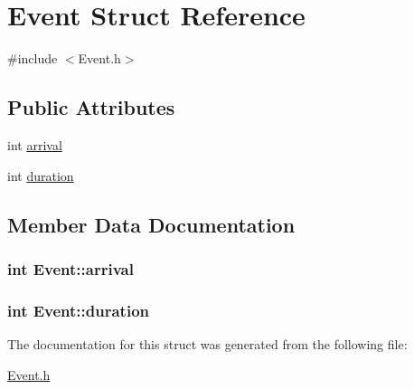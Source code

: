 \hypertarget{struct_event}{}\section{Event Struct Reference}
\label{struct_event}


{\ttfamily \#include $<$Event.\+h$>$}

\subsection*{Public Attributes}
\begin{DoxyCompactItemize}
\item 
int \hyperlink{struct_event_a3782e35ec08a4b5a8112b03404133be8}{arrival}
\item 
int \hyperlink{struct_event_aa083855a26c42d10c9dd5978f7066db8}{duration}
\end{DoxyCompactItemize}


\subsection{Member Data Documentation}
\subsubsection[{\texorpdfstring{arrival}{arrival}}]{\setlength{\rightskip}{0pt plus 5cm}int Event\+::arrival}\hypertarget{struct_event_a3782e35ec08a4b5a8112b03404133be8}{}\label{struct_event_a3782e35ec08a4b5a8112b03404133be8}
\subsubsection[{\texorpdfstring{duration}{duration}}]{\setlength{\rightskip}{0pt plus 5cm}int Event\+::duration}\hypertarget{struct_event_aa083855a26c42d10c9dd5978f7066db8}{}\label{struct_event_aa083855a26c42d10c9dd5978f7066db8}


The documentation for this struct was generated from the following file\+:\begin{DoxyCompactItemize}
\item 
\hyperlink{_event_8h}{Event.\+h}\end{DoxyCompactItemize}
